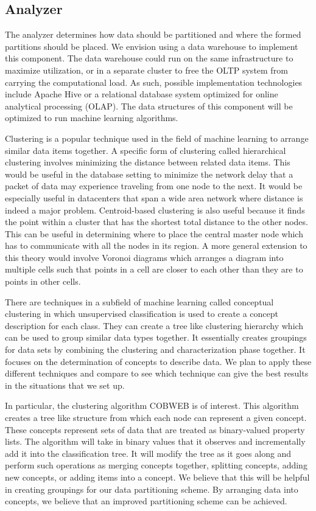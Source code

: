 \documentclass[10pt,final,journal]{IEEEtran}
\begin{document}
\subsection{Analyzer}
The analyzer determines how data should be partitioned and where the formed partitions should be placed. We envision using a data warehouse to implement this component. The data warehouse could run on the same infrastructure to maximize utilization, or in a separate cluster to free the OLTP system from carrying the computational load. As such, possible implementation technologies include Apache Hive or a relational database system optimized for online analytical processing (OLAP). The data structures of this component will be optimized to run machine learning algorithms.

Clustering is a popular technique used in the field of machine learning to arrange similar data items together.  A specific form of clustering called hierarchical clustering involves minimizing the distance between related data items.  This would be useful in the database setting to minimize the network delay that a packet of data may experience traveling from one node to the next.  It would be especially useful in datacenters that span a wide area network where distance is indeed a major problem.  Centroid-based clustering is also useful because it finds the point within a cluster that has the shortest total distance to the other nodes.  This can be useful in determining where to place the central master node which has to communicate with all the nodes in its region.  A more general extension to this theory would involve Voronoi diagrams which arranges a diagram into multiple cells such that points in a cell are closer to each other than they are to points in other cells.

There are techniques in a subfield of machine learning called conceptual clustering in which unsupervised classification is used to create a concept description for each class. They can create a tree like clustering hierarchy which can be used to group similar data types together. It essentially creates groupings for data sets by combining the clustering and characterization phase together. It focuses on the determination of concepts to describe data. We plan to apply these different techniques and compare to see which technique can give the best results in the situations that we set up.

In particular, the clustering algorithm COBWEB is of interest. This algorithm creates a tree like structure from which each node can represent a given concept. These concepts represent sets of data that are treated as binary-valued property lists. The algorithm will take in binary values that it observes and incrementally add it into the classification tree. It will modify the tree as it goes along and perform such operations as merging concepts together, splitting concepts, adding new concepts, or adding items into a concept. We believe that this will be helpful in creating groupings for our data partitioning scheme. By arranging data into concepts, we believe that an improved partitioning scheme can be achieved.
\end{document}
